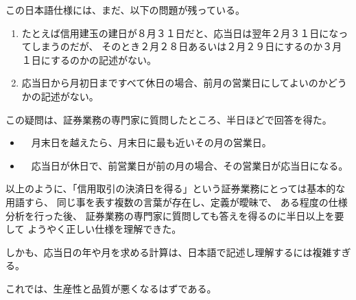 この日本語仕様には、まだ、以下の問題が残っている。

\begin{enumerate}
\item たとえば信用建玉の建日が８月３１日だと、応当日は翌年２月３１日になってしまうのだが、
	そのとき２月２８日あるいは２月２９日にするのか３月１日にするのかの記述がない。
\item 応当日から月初日まですべて休日の場合、前月の営業日にしてよいのかどうかの記述がない。
\end{enumerate}

この疑問は、証券業務の専門家に質問したところ、半日ほどで回答を得た。

\begin{itemize}
	\item　月末日を越えたら、月末日に最も近いその月の営業日。
	\item　応当日が休日で、前営業日が前の月の場合、その営業日が応当日になる。
\end{itemize} 

以上のように、「信用取引の決済日を得る」という証券業務にとっては基本的な用語すら、
同じ事を表す複数の言葉が存在し、定義が曖昧で、
ある程度の仕様分析を行った後、
証券業務の専門家に質問しても答えを得るのに半日以上を要して
ようやく正しい仕様を理解できた。

しかも、応当日の年や月を求める計算は、日本語で記述し理解するには複雑すぎる。

これでは、生産性と品質が悪くなるはずである。
